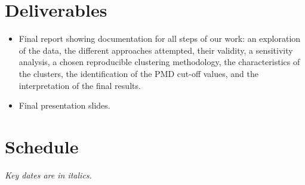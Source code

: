 \documentclass[11pt, a4paper]{article}
\begin{document}
\section*{Deliverables}

\begin{itemize}
\item Final report showing documentation for all steps of our work: an exploration of the data, the different approaches attempted, their validity, a sensitivity analysis, a chosen reproducible clustering methodology, the characteristics of the clusters, the identification of the PMD cut-off values, and the interpretation of the final results. 
\item Final presentation slides.
\end{itemize}




\pagebreak
\section*{Schedule}

\textit{Key dates are in italics.}
\end{document}
